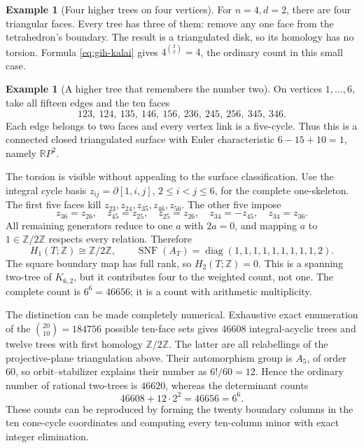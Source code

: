 \documentclass[11pt]{article}
\theoremstyle{definition}
\newtheorem{example}[theorem]{Example}
\theoremstyle{remark}
\newcommand{\Z}{\mathbb Z}
\newcommand{\R}{\mathbb R}
\begin{document}
\begin{example}[Four higher trees on four vertices]
For \(n=4,d=2\), there are four triangular faces.  Every tree has three
of them: remove any one face from the tetrahedron's boundary.  The
result is a triangulated disk, so its homology has no torsion.  Formula
\eqref{eq:gih-kalai} gives \(4^{\binom22}=4\), the ordinary count in
this small case.
\end{example}

\begin{example}[A higher tree that remembers the number two]
On vertices \(1,\ldots,6\), take all fifteen edges and the ten faces
\[
 123,\ 124,\ 135,\ 146,\ 156,\
 236,\ 245,\ 256,\ 345,\ 346.
\]
Each edge belongs to two faces and every vertex link is a five-cycle.
Thus this is a connected closed triangulated surface with Euler
characteristic \(6-15+10=1\), namely \(\R P^2\).

The torsion is visible without appealing to the surface classification.
Use the integral cycle basis
\(z_{ij}=\partial[1,i,j]\), \(2\le i<j\le6\), for the complete
one-skeleton.  The first five faces kill
\(z_{23},z_{24},z_{35},z_{46},z_{56}\).  The other five impose
\[
 z_{36}=z_{26},\quad z_{45}=z_{25},\quad z_{25}=z_{26},
 \quad z_{34}=-z_{45},\quad z_{34}=z_{36}.
\]
All remaining generators reduce to one \(a\) with \(2a=0\), and
mapping \(a\) to \(1\in\Z/2\Z\) respects every relation.  Therefore
\[
 H_1(T;\Z)\cong\Z/2\Z,
 \qquad \operatorname{SNF}(A_T)
        =\operatorname{diag}(1,1,1,1,1,1,1,1,1,2).
\]
The square boundary map has full rank, so \(H_2(T;\Z)=0\).
This is a spanning two-tree of \(K_{6,2}\), but it contributes four
to the weighted count, not one.  The complete count is \(6^6=46656\);
it is a count with arithmetic multiplicity.

The distinction can be made completely numerical. Exhaustive exact enumeration of the $\binom{20}{10}=184756$ possible ten-face sets gives 46608 integral-acyclic trees and twelve trees with first homology $\Z/2\Z$. The latter are all relabellings of the projective-plane triangulation above. Their automorphism group is $A_5$, of order $60$, so orbit--stabilizer explains their number as $6!/60=12$. Hence the ordinary number of rational two-trees is $46620$, whereas the determinant counts
\[
 46608+12\cdot 2^2=46656=6^6.
\]
These counts can be reproduced by forming the twenty boundary columns in the ten cone-cycle coordinates and computing every ten-column minor with exact integer elimination.
\end{example}
\end{document}
